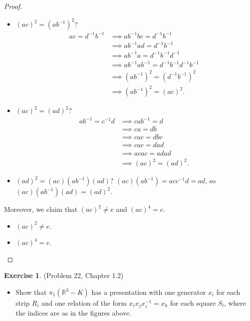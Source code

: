 \documentclass[12pt, psamsfonts]{amsart}
\theoremstyle{definition}
\newtheorem*{exer}{Exercise}
\theoremstyle{remark}
\numberwithin{equation}{section}
\begin{document}
\begin{proof}
  \begin{itemize}
    \item
      $(ac)^2 = (ab^{-1})^2$?
      \begin{align*}
        ac = d^{-1}b^{-1}
          &\implies ab^{-1}bc = d^{-1}b^{-1} \\
          &\implies ab^{-1}ad = d^{-1}b^{-1} \\
          &\implies ab^{-1}a = d^{-1}b^{-1}d^{-1} \\
          &\implies ab^{-1}ab^{-1} = d^{-1}b^{-1}d^{-1}b^{-1} \\
          &\implies (ab^{-1})^2 = (d^{-1}b^{-1})^2 \\
          &\implies (ab^{-1})^2 = (ac)^2.
      \end{align*}
    \item
      $(ac)^2 = (ad)^2$?
      \begin{align*}
        ab^{-1} = c^{-1}d
          &\implies cab^{-1} = d \\
          &\implies ca = db \\
          &\implies cac = dbc \\
          &\implies cac = dad \\
          &\implies acac = adad \\
          &\implies (ac)^2 = (ad)^2.
      \end{align*}
    \item
      $(ad)^2 = (ac)(ab^{-1})(ad)$?
      $(ac)(ab^{-1}) = acc^{-1}d = ad$, so $(ac)(ab^{-1})(ad) = (ad)^2$.
  \end{itemize}

  Moreover, we claim that $(ac)^2 \ne e$ and $(ac)^4 = e$.

  \begin{itemize}
    \item
      $(ac)^2 \ne e$.
    \item
      $(ac)^4 = e$.
  \end{itemize}
  
\end{proof}

\begin{exer}{(Problem 22, Chapter 1.2)}
  $ $
  \begin{itemize}
    \item
      Show that $\pi_1(\mathbb{R}^3 - K)$ has a presentation with one generator $x_i$ for each strip $R_i$ and one relation of the form $x_ix_jx_i^{-1} = x_k$ for each square $S_l$,
      where the indices are as in the figures above.
  \end{itemize}
\end{exer}
\end{document}
